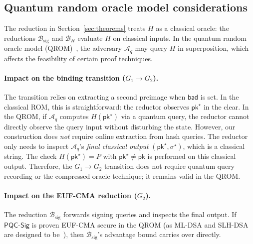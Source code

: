 \documentclass[11pt]{article}
\newcommand{\Aq}{\mathcal{A}_q}
\newcommand{\PQC}{\mathsf{PQC}}
\begin{document}
\subsection{Quantum random oracle model considerations}\label{sec:qrom}

The reduction in Section~\ref{sec:theorems} treats $H$ as a classical oracle: the reductions $\mathcal{B}_{\mathrm{sig}}$ and $\mathcal{B}_H$ evaluate $H$ on classical inputs.
In the quantum random oracle model (QROM)~\cite{boneh2011random}, the adversary $\Aq$ may query $H$ in superposition, which affects the feasibility of certain proof techniques.

\paragraph{Impact on the binding transition ($G_1 \to G_2$).}
The transition relies on extracting a second preimage when $\mathsf{bad}$ is set.
In the classical ROM, this is straightforward: the reductor observes $\mathsf{pk}^\star$ in the clear.
In the QROM, if $\Aq$ computes $H(\mathsf{pk}^\star)$ via a quantum query, the reductor cannot directly observe the query input without disturbing the state.
However, our construction does \emph{not} require online extraction from hash queries.
The reductor only needs to inspect $\Aq$'s \emph{final classical output} $(\mathsf{pk}^\star,\sigma^\star)$, which is a classical string.
The check $H(\mathsf{pk}^\star)=P$ with $\mathsf{pk}^\star\neq\mathsf{pk}$ is performed on this classical output.
Therefore, the $G_1\to G_2$ transition does not require quantum query recording or the compressed oracle technique; it remains valid in the QROM.

\paragraph{Impact on the EUF-CMA reduction ($G_2$).}
The reduction $\mathcal{B}_{\mathrm{sig}}$ forwards signing queries and inspects the final output.
If $\PQC\textsf{-Sig}$ is proven EUF-CMA secure in the QROM (as ML-DSA and SLH-DSA are designed to be~\cite{fips204,fips205}), then $\mathcal{B}_{\mathrm{sig}}$'s advantage bound carries over directly.
\end{document}
